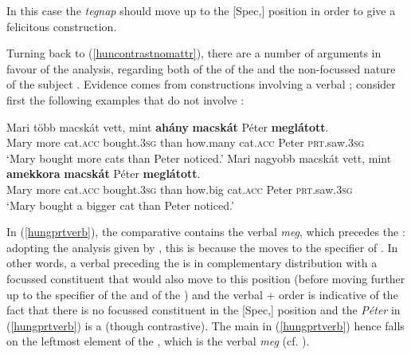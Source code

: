\z
	
In this case the  \textit{tegnap} should move up to the [Spec,] position in order to give a felicitous construction.

Turning back to (\ref{huncontrastnomattr}), there are a number of arguments in favour of the analysis, regarding both of the  of the  and the non-focussed nature of the subject . Evidence comes from constructions involving a verbal ; consider first the following examples that do not involve :

\ea \label{hungprtverb}
\ea \gll	Mari	több	macskát	vett,	mint	\textbf{ahány} \textbf{macskát}	Péter	\textbf{meglátott}.\\
Mary	more	cat.\textsc{acc}	bought.\textsc{3sg}	than	how.many cat.\textsc{acc} Peter \textsc{prt}.saw.\textsc{3sg}\\
\glt `Mary bought more cats than Peter noticed.'
\ex \gll	Mari	nagyobb	macskát	vett,	mint	\textbf{amekkora} \textbf{macskát}	Péter	\textbf{meglátott}.\\
Mary	more	cat.\textsc{acc}	bought.\textsc{3sg}	than	how.big cat.\textsc{acc} Peter \textsc{prt}.saw.\textsc{3sg}\\
\glt `Mary bought a bigger cat than Peter noticed.'
\z
\z

In (\ref{hungprtverb}), the comparative  contains the verbal  \textit{meg}, which precedes the : adopting the analysis given by \citet{ekiss2008}, this is because the  moves to the specifier of . In other words, a verbal  preceding the  is in complementary distribution with a focussed constituent that would also move to this position (before moving further up to the specifier of the  and of the ) and the verbal  +  order is indicative of the fact that there is no focussed constituent in the [Spec,] position and the  \textit{Péter} in (\ref{hungprtverb}) is a  (though contrastive). The main  in (\ref{hungprtverb}) hence falls on the leftmost element of the , which is the verbal  \textit{meg} (cf.  \citealt{szendroi2001diss}).

